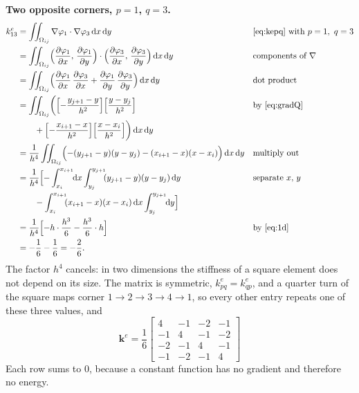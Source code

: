 \documentclass[11pt]{article}
\newcommand{\dxdy}{\,\mathrm{d}x\,\mathrm{d}y}
\newcommand{\Om}{\Omega}
\newcommand{\grad}{\nabla}
\begin{document}
\textbf{Two opposite corners, $p=1$, $q=3$.}
\begin{align}
  k^{e}_{13}
  &=\iint_{\Om_{ij}}\grad\varphi_{1}\cdot\grad\varphi_{3}\dxdy
   &&\text{\eqref{eq:kepq} with }p=1,\ q=3\notag\\
  &=\iint_{\Om_{ij}}\Bigl(\frac{\partial\varphi_{1}}{\partial x},\,\frac{\partial\varphi_{1}}{\partial y}\Bigr)\cdot\Bigl(\frac{\partial\varphi_{3}}{\partial x},\,\frac{\partial\varphi_{3}}{\partial y}\Bigr)\dxdy
   &&\text{components of }\grad\notag\\
  &=\iint_{\Om_{ij}}\Bigl(\frac{\partial\varphi_{1}}{\partial x}\,\frac{\partial\varphi_{3}}{\partial x}+\frac{\partial\varphi_{1}}{\partial y}\,\frac{\partial\varphi_{3}}{\partial y}\Bigr)\dxdy
   &&\text{dot product}\notag\\
  &=\iint_{\Om_{ij}}\biggl(\Bigl[-\frac{y_{j+1}-y}{h^{2}}\Bigr]\Bigl[\frac{y-y_{j}}{h^{2}}\Bigr]
   &&\text{by \eqref{eq:gradQ}}\notag\\
  &\qquad+\Bigl[-\frac{x_{i+1}-x}{h^{2}}\Bigr]\Bigl[\frac{x-x_{i}}{h^{2}}\Bigr]\biggr)\dxdy\notag\\
  &=\frac{1}{h^{4}}\iint_{\Om_{ij}}\Bigl(-(y_{j+1}-y)(y-y_{j})-(x_{i+1}-x)(x-x_{i})\Bigr)\dxdy
   &&\text{multiply out}\notag\\
  &=\frac{1}{h^{4}}\Bigl[-\int_{x_{i}}^{x_{i+1}}\!\!\mathrm{d}x\int_{y_{j}}^{y_{j+1}}\!\!(y_{j+1}-y)(y-y_{j})\,\mathrm{d}y
   &&\text{separate }x,\,y\notag\\
  &\qquad-\int_{x_{i}}^{x_{i+1}}\!\!(x_{i+1}-x)(x-x_{i})\,\mathrm{d}x\int_{y_{j}}^{y_{j+1}}\!\!\mathrm{d}y\Bigr]\notag\\
  &=\frac{1}{h^{4}}\Bigl[-h\cdot\frac{h^{3}}{6}-\frac{h^{3}}{6}\cdot h\Bigr]
   &&\text{by \eqref{eq:1d}}\notag\\
  &=-\frac16-\frac16=-\frac26 .\label{eq:kecases}
\end{align}
The factor $h^{4}$ cancels: in two dimensions the stiffness of a square
element does not depend on its size.  The matrix is symmetric,
$k^{e}_{pq}=k^{e}_{qp}$, and a quarter turn of the square maps corner
$1\to2\to3\to4\to1$, so every other entry repeats one of these three
values, and
\begin{equation}\label{eq:ke}
  \boxed{\;\bm{k}^{e}=\frac16\begin{bmatrix}
     4&-1&-2&-1\\ -1&4&-1&-2\\ -2&-1&4&-1\\ -1&-2&-1&4\end{bmatrix}\;}
\end{equation}
Each row sums to $0$, because a constant function has no gradient and
therefore no energy.
\end{document}
